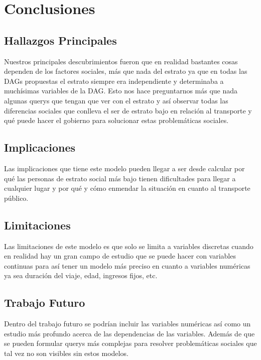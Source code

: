 \documentclass[12pt,a4paper]{article}
\begin{document}
\section{Conclusiones}

\subsection{Hallazgos Principales}

Nuestros principales descubrimientos fueron que en realidad bastantes cosas dependen de los factores sociales, más que nada del estrato ya que en todas las DAGs propuestas el estrato siempre era independiente y determinaba a muchísimas variables de la DAG. Esto nos hace preguntarnos más que nada algunas querys que tengan que ver con el estrato y así observar todas las diferencias sociales que conlleva el ser de estrato bajo en relación al transporte y qué puede hacer el gobierno para solucionar estas problemáticas sociales.

\subsection{Implicaciones}

Las implicaciones que tiene este modelo pueden llegar a ser desde calcular por qué las personas de estrato social más bajo tienen dificultades para llegar a cualquier lugar y por qué y cómo enmendar la situación en cuanto al transporte público.

\subsection{Limitaciones}

Las limitaciones de este modelo es que solo se limita a variables discretas cuando en realidad hay un gran campo de estudio que se puede hacer con variables continuas para así tener un modelo más preciso en cuanto a variables numéricas ya sea duración del viaje, edad, ingresos fijos, etc.

\subsection{Trabajo Futuro}

Dentro del trabajo futuro se podrían incluir las variables numéricas así como un estudio más profundo acerca de las dependencias de las variables. Además de que se pueden formular querys más complejas para resolver problemáticas sociales que tal vez no son visibles sin estos modelos.
\end{document}
